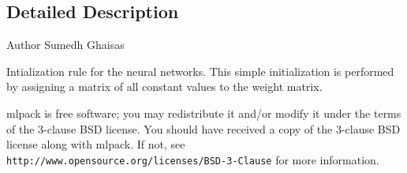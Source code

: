 \subsection{Detailed Description}
\begin{DoxyAuthor}{Author}
Sumedh Ghaisas
\end{DoxyAuthor}
Intialization rule for the neural networks. This simple initialization is performed by assigning a matrix of all constant values to the weight matrix.

mlpack is free software; you may redistribute it and/or modify it under the terms of the 3-\/clause B\+SD license. You should have received a copy of the 3-\/clause B\+SD license along with mlpack. If not, see {\tt http\+://www.\+opensource.\+org/licenses/\+B\+S\+D-\/3-\/\+Clause} for more information. 